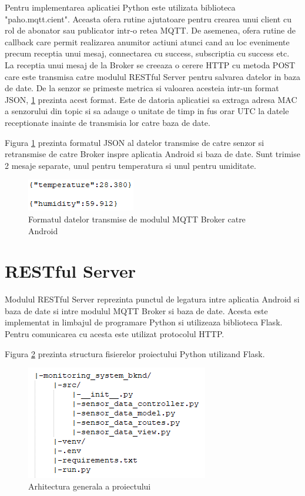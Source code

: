 Pentru implementarea aplicatiei Python este utilizata biblioteca "paho.mqtt.cient". Aceasta ofera rutine ajutatoare pentru crearea unui client cu rol de abonator sau publicator 
intr-o retea MQTT. De asemenea, ofera rutine de callback care permit realizarea anumitor actiuni atunci cand au loc evenimente precum receptia unui mesaj, connectarea cu 
success, subscriptia cu success etc. La receptia unui mesaj de la Broker se creeaza o cerere HTTP cu metoda POST care este transmisa catre modulul RESTful Server pentru 
salvarea datelor in baza de date. De la senzor se primeste metrica si valoarea acesteia intr-un format JSON, \ref{fig:Mqtt2AndroidDataFormat} prezinta acest format. Este de 
datoria aplicatiei sa extraga adresa MAC a senzorului din topic si sa adauge o unitate de timp in fus orar UTC la datele receptionate inainte de transmisia lor catre baza de 
date.

Figura \ref{fig:Mqtt2AndroidDataFormat} prezinta formatul JSON al datelor transmise de catre senzor si retransmise de catre Broker inspre aplicatia Android si baza de date. 
Sunt trimise 2 mesaje separate, unul pentru temperatura si unul pentru umiditate. 
\begin{figure}[H]
    \centering
    \includegraphics[scale=0.8]{figs/Mqtt2AndroidDataFormat.png}
    \caption{Formatul datelor transmise de modulul MQTT Broker catre Android}
    \label{fig:Mqtt2AndroidDataFormat}
\end{figure}

\section{RESTful Server}\label{sec:pi_restserver}
Modulul RESTful Server reprezinta punctul de legatura intre aplicatia Android si baza de date si intre modulul MQTT Broker si baza de date. Acesta este implementat in limbajul 
de programare Python si utilizeaza biblioteca Flask. Pentru comunicarea cu acesta este utilizat protocolul HTTP. 

Figura \ref{fig:PI_RealFlaskProjectStructure} prezinta structura fisierelor proiectului Python utilizand Flask. 
\begin{figure}[H]
    \centering
    \includegraphics[scale=0.9]{figs/PI_RealFlaskProjectStructure.png}
    \caption{Arhitectura generala a proiectului}
    \label{fig:PI_RealFlaskProjectStructure}
\end{figure}

